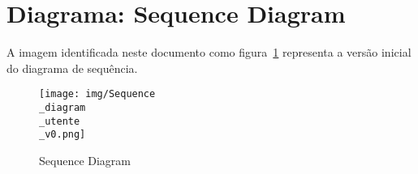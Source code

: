 
\section{Diagrama: Sequence Diagram}
A imagem identificada neste documento como figura~\ref{fig:sd3160} representa a versão inicial do diagrama de sequência.

\begin{figure}[htb]
	\centering
	\texttt{[image: img/Sequence\\\_diagram\\\_utente\\\_v0.png]}  %
	\caption{Sequence Diagram}
	\label{fig:sd3160}
\end{figure}


